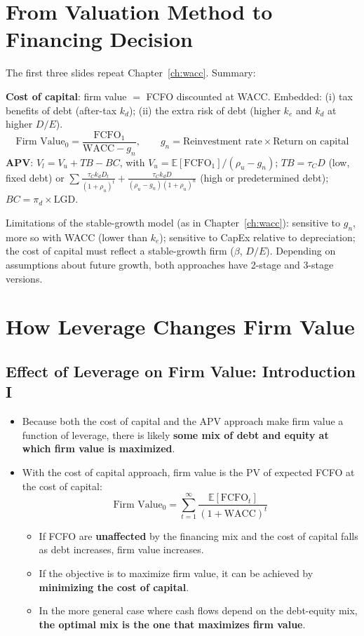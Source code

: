 \section{From Valuation Method to Financing Decision}

The first three slides repeat Chapter~\ref{ch:wacc}. Summary:
\begin{keybox}
\textbf{Cost of capital}: firm value $=$ FCFO discounted at WACC. Embedded: (i) tax benefits of debt (after-tax $k_d$); (ii) the extra risk of debt (higher $k_e$ and $k_d$ at higher $D/E$).
\[
\text{Firm Value}_0=\frac{\text{FCFO}_1}{\text{WACC}-g_n},\qquad g_n=\text{Reinvestment rate}\times\text{Return on capital}
\]
\textbf{APV}: $V_l=V_u+TB-BC$, with $V_u=\mathbb{E}[\text{FCFO}_1]/(\rho_u-g_n)$; $TB=\tau_C D$ (low, fixed debt) or $\sum\frac{\tau_C k_d D_t}{(1+\rho_u)^t}+\frac{\tau_C k_d D}{(\rho_u-g_n)(1+\rho_u)^n}$ (high or predetermined debt); $BC=\pi_d\times\text{LGD}$.
\end{keybox}
Limitations of the stable-growth model (as in Chapter~\ref{ch:wacc}): sensitive to $g_n$, more so with WACC (lower than $k_e$); sensitive to CapEx relative to depreciation; the cost of capital must reflect a stable-growth firm ($\beta$, $D/E$). Depending on assumptions about future growth, both approaches have 2-stage and 3-stage versions.

\section{How Leverage Changes Firm Value}

\subsection[Effect of Leverage on Firm Value: Introduction I]{Effect of Leverage on Firm Value: Introduction I }

\begin{itemize}
  \item Because both the cost of capital and the APV approach make firm value a function of leverage, there is likely \textbf{some mix of debt and equity at which firm value is maximized}.
  \item With the cost of capital approach, firm value is the PV of expected FCFO at the cost of capital:
  \[
  \text{Firm Value}_0=\sum_{t=1}^{\infty}\frac{\mathbb{E}[\text{FCFO}_t]}{(1+\text{WACC})^t}
  \]
  \begin{itemize}
    \item If FCFO are \textbf{unaffected} by the financing mix and the cost of capital falls as debt increases, firm value increases.
    \item If the objective is to maximize firm value, it can be achieved by \textbf{minimizing the cost of capital}.
    \item In the more general case where cash flows depend on the debt-equity mix, \textbf{the optimal mix is the one that maximizes firm value}.
  \end{itemize}
\end{itemize}

